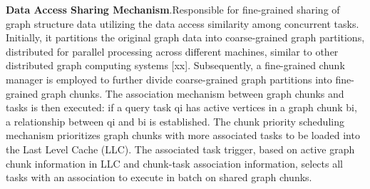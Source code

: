 \documentclass[lettersize,journal]{IEEEtran} %
\begin{document}
{\bf{Data Access Sharing Mechanism}}.Responsible for fine-grained sharing of graph structure data utilizing the data access similarity among concurrent tasks. Initially, it partitions the original graph data into coarse-grained graph partitions, distributed for parallel processing across different machines, similar to other distributed graph computing systems [xx]. Subsequently, a fine-grained chunk manager is employed to further divide coarse-grained graph partitions into fine-grained graph chunks. The association mechanism between graph chunks and tasks is then executed: if a query task qi has active vertices in a graph chunk bi, a relationship between qi and bi is established. The chunk priority scheduling mechanism prioritizes graph chunks with more associated tasks to be loaded into the Last Level Cache (LLC). The associated task trigger, based on active graph chunk information in LLC and chunk-task association information, selects all tasks with an association to execute in batch on shared graph chunks.
\end{document}
